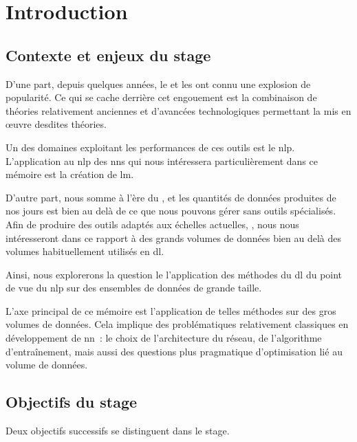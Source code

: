 \chapter{Introduction}

\section[Contexte \& Enjeux]{Contexte et enjeux du stage}

D'une part, depuis quelques années, le \og{}\fg{} et les \og{}\fg{} ont connu une explosion de popularité.
Ce qui se cache derrière cet engouement est la combinaison de théories relativement anciennes et d'avancées technologiques permettant la mis en œuvre desdites théories.

Un des domaines exploitant les performances de ces outils est le \gls{nlp}.
L'application au \gls{nlp} des \glspl{nn} qui nous intéressera particulièrement dans ce mémoire est la création de \gls{lm}.

D'autre part, nous somme à l'ère du \og{}\fg{}, et les quantités de données produites de nos jours est bien au delà de ce que nous pouvons gérer sans outils spécialisés.
Afin de produire des outils adaptés aux échelles actuelles, , nous nous intéresseront dans ce rapport à des grands volumes de données bien au delà des volumes habituellement utilisés en \gls{dl}.

Ainsi, nous explorerons la question le l'application des méthodes du \gls{dl} du point de vue du \gls{nlp} sur des ensembles de données de grande taille.

L'axe principal de ce mémoire est l'application de telles méthodes sur des gros volumes de données.
Cela implique des problématiques relativement classiques en développement de \gls{nn}~: le choix de l'architecture du réseau, de l'algorithme d'entraînement, mais aussi des questions plus pragmatique d'optimisation lié au volume de données.%


\section[Objectifs]{Objectifs du stage}
Deux objectifs successifs se distinguent dans le stage.

